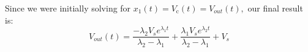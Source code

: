 {  Since we were initially solving for $x_{1}(t) = V_{\text{c}}(t) = V_{out}(t),$ our final result is:
  $$V_{out}(t) = \frac{-\lambda_{2} V_s e^{\lambda_{1} t}}{\lambda_{2} - \lambda_{1}} + \frac{\lambda_{1} V_s e^{\lambda_{2} t}}{\lambda_{2} - \lambda_{1}} + V_s$$
}









